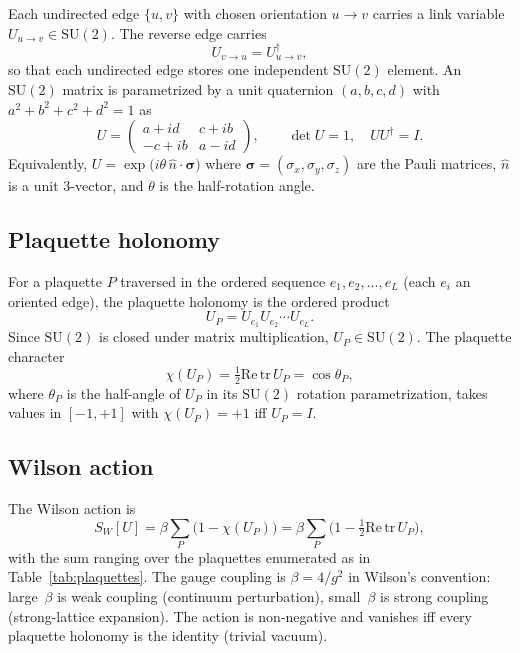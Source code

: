 \documentclass[11pt]{article}
\begin{document}
Each undirected edge $\{u, v\}$ with chosen orientation $u \to v$
carries a link variable $U_{u \to v} \in \mathrm{SU}(2)$.  The reverse
edge carries
\begin{equation}
U_{v \to u} = U_{u \to v}^{\dagger},
\label{eq:reverse_convention}
\end{equation}
so that each undirected edge stores one independent $\mathrm{SU}(2)$
element.  An $\mathrm{SU}(2)$ matrix is parametrized by a unit
quaternion $(a, b, c, d)$ with $a^2 + b^2 + c^2 + d^2 = 1$ as
\begin{equation}
U = \begin{pmatrix} a + i d & c + i b \\ -c + i b & a - i d \end{pmatrix},
\qquad
\det U = 1, \quad U U^{\dagger} = I.
\label{eq:su2_quaternion}
\end{equation}
Equivalently, $U = \exp\bigl(i \theta\,\hat{n} \cdot \boldsymbol{\sigma}\bigr)$
where $\boldsymbol{\sigma} = (\sigma_x, \sigma_y, \sigma_z)$ are the
Pauli matrices, $\hat{n}$ is a unit 3-vector, and $\theta$ is the
half-rotation angle.

\subsection{Plaquette holonomy}

For a plaquette $P$ traversed in the ordered sequence
$e_1, e_2, \ldots, e_L$ (each $e_i$ an oriented edge), the plaquette
holonomy is the ordered product
\begin{equation}
U_P = U_{e_1} U_{e_2} \cdots U_{e_L}.
\label{eq:plaquette_holonomy}
\end{equation}
Since $\mathrm{SU}(2)$ is closed under matrix multiplication,
$U_P \in \mathrm{SU}(2)$.  The plaquette character
\begin{equation}
\chi(U_P) = \tfrac{1}{2} \mathrm{Re}\,\mathrm{tr}\,U_P
= \cos \theta_P,
\label{eq:plaquette_character}
\end{equation}
where $\theta_P$ is the half-angle of $U_P$ in its $\mathrm{SU}(2)$
rotation parametrization, takes values in $[-1, +1]$ with
$\chi(U_P) = +1$ iff $U_P = I$.

\subsection{Wilson action}

The Wilson action is
\begin{equation}
S_W[U] = \beta \sum_P \bigl(1 - \chi(U_P)\bigr)
= \beta \sum_P \bigl(1 - \tfrac{1}{2}\mathrm{Re}\,\mathrm{tr}\,U_P\bigr),
\label{eq:wilson_action}
\end{equation}
with the sum ranging over the plaquettes enumerated as in
Table~\ref{tab:plaquettes}.  The gauge coupling is $\beta = 4/g^2$ in
Wilson's convention: large~$\beta$ is weak coupling (continuum
perturbation), small~$\beta$ is strong coupling (strong-lattice
expansion).  The action is non-negative and vanishes iff every
plaquette holonomy is the identity (trivial vacuum).
\end{document}
